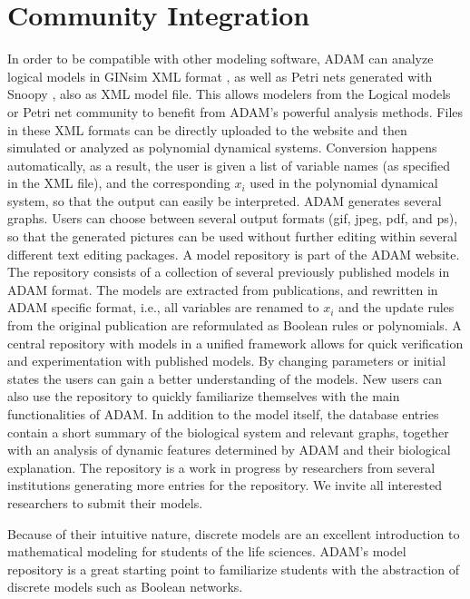 \documentclass[11pt]{amsart}
\begin{document}
\section{Community Integration}
In order to be compatible with other modeling software, ADAM can analyze logical models in GINsim XML format \cite{GINsim}, as well as Petri nets generated with Snoopy \cite{Snoopy}, also as XML model file. This allows modelers from the Logical models or Petri net community to benefit from ADAM's powerful analysis methods. Files in these XML formats can be directly uploaded to the website and then simulated or analyzed as polynomial dynamical systems. Conversion happens automatically, as a result, the user is given a list of variable names (as specified in the XML file), and the corresponding $x_i$ used in the polynomial dynamical system, so that the output can easily be interpreted.
ADAM generates several graphs. Users can choose between several output formats (gif, jpeg, pdf, and ps), so that the generated pictures can be used without further editing within several different text editing packages.
A model repository is part of the ADAM website. The repository consists of a collection of several previously published models in ADAM format. The models are extracted from publications, and rewritten in ADAM specific format, i.e., all variables are renamed to $x_i$ and the update rules from the original publication are reformulated as Boolean rules or polynomials. A central repository with models in a unified framework allows for quick verification and experimentation with published models. By changing parameters or initial states the users can gain a better understanding of the models.
New users can also use the repository to quickly familiarize themselves with the main functionalities of ADAM. In addition to the model itself, the database entries contain a short summary of the biological system and relevant graphs, together with an analysis of dynamic features determined by ADAM and their biological explanation. The repository is a work in progress by researchers from several institutions generating more entries for the repository.  We invite all interested researchers to submit their models. 
 
 
Because of their intuitive nature, discrete models are an excellent introduction to mathematical modeling for students of the life sciences. ADAM's model repository is a great starting point to familiarize students with the abstraction of discrete models such as Boolean networks.
\end{document}
